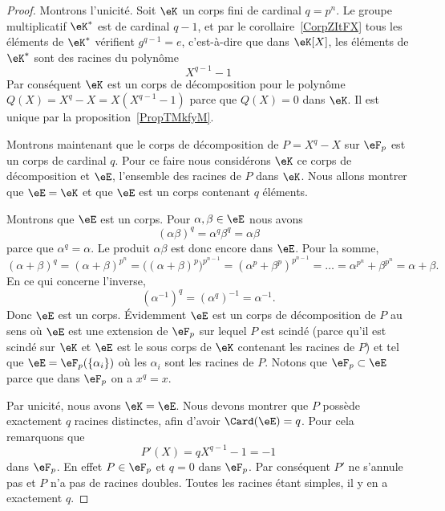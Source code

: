 \begin{proof}
    Montrons l'unicité. Soit \( \eK\) un corps fini de cardinal \( q=p^n\). Le groupe multiplicatif \( \eK^*\) est de cardinal \( q-1\), et par le corollaire~\ref{CorpZItFX} tous les éléments de \( \eK^*\) vérifient \( g^{q-1}=e\), c'est-à-dire que dans \( \eK[X]\), les éléments de \( \eK^*\) sont des racines du polynôme
    \begin{equation}
        X^{q-1}-1
    \end{equation}
    Par conséquent \( \eK\) est un corps de décomposition pour le polynôme \( Q(X)=X^q-X=X(X^{q-1}-1)\) parce que \( Q(X)=0\) dans \( \eK\). Il est unique par la proposition~\ref{PropTMkfyM}.

    Montrons maintenant que le corps de décomposition de \( P=X^q-X\) sur \( \eF_p\) est un corps de cardinal \( q\). Pour ce faire nous considérons \( \eK\) ce corps de décomposition et \(\eE\), l'ensemble des racines de \( P\) dans \( \eK\). Nous allons montrer que \( \eE=\eK\) et que \( \eE\) est un corps contenant \( q\) éléments.

    Montrons que \( \eE\) est un corps. Pour \( \alpha,\beta\in \eE\) nous avons
    \begin{equation}
        (\alpha\beta)^q=\alpha^q\beta^q=\alpha\beta
    \end{equation}
    parce que \( \alpha^q=\alpha\). Le produit \( \alpha\beta\) est donc encore dans \( \eE\). Pour la somme,
    \begin{equation}
        (\alpha+\beta)^q=(\alpha+\beta)^{p^n}=\Big( (\alpha+\beta)^p \Big)^{p^{n-1}}=(\alpha^p+\beta^p)^{p^{n-1}}=\ldots=\alpha^{p^n}+\beta^{p^n}=\alpha+\beta.
    \end{equation}
    En ce qui concerne l'inverse,
    \begin{equation}
        (\alpha^{-1})^q=(\alpha^q)^{-1}=\alpha^{-1}.
    \end{equation}
    Donc \( \eE\) est un corps. Évidemment \( \eE\) est un corps de décomposition de \( P\) au sens où \( \eE\) est une extension de \( \eF_p\) sur lequel \( P\) est scindé (parce qu'il est scindé sur \( \eK\) et \( \eE\) est le sous corps de \( \eK\) contenant les racines de \( P\)) et tel que \( \eE=\eF_p(\{ \alpha_i \})\) où les \( \alpha_i\) sont les racines de \( P\). Notons que \( \eF_p\subset \eE\) parce que dans \( \eF_p\) on a \( x^q=x\).

    Par unicité, nous avons \( \eK=\eE\). Nous devons montrer que \( P\) possède exactement \( q\) racines distinctes, afin d'avoir \( \Card(\eE)=q\). Pour cela remarquons que
    \begin{equation}
        P'(X)=qX^{q-1}-1=-1
    \end{equation}
    dans \( \eF_p\). En effet \( P\in\eF_p\) et \( q=0\) dans \( \eF_p\). Par conséquent \( P'\) ne s'annule pas et \( P\) n'a pas de racines doubles. Toutes les racines étant simples, il y en a exactement \( q\).

\end{proof}

